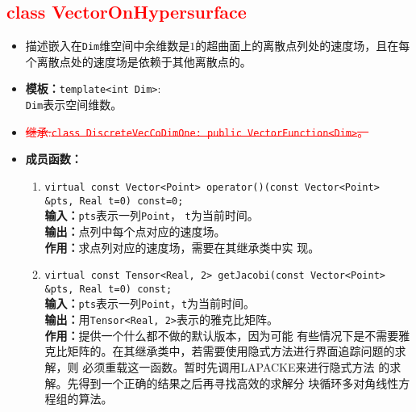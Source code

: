 \documentclass[a4paper,twoside]{ctexart}
\begin{document}
\textcolor{red}{
\section{class VectorOnHypersurface}}
\begin{itemize}
    \item 描述嵌入在\texttt{Dim}维空间中余维数是$1$的超曲面上的离散点列处的速度场，且在每个离散点处的速度场是依赖于其他离散点的。
    \item \textbf{模板：}\texttt{template<int Dim>}:\\
    \texttt{Dim}表示空间维数。
    \item \textcolor{red}{\sout{继承:\texttt{class DiscreteVecCoDimOne: public VectorFunction<Dim>}。}}
    \item \textbf{成员函数：}
            \begin{enumerate}[(1)]
                \item \texttt{virtual const Vector<Point> operator()(const Vector<Point> \&pts, Real t=0) const=0;}\\
                \textbf{输入：}\texttt{pts}表示一列\texttt{Point}，
                \texttt{t}为当前时间。\\
                \textbf{输出：}点列中每个点对应的速度场。\\
                \textbf{作用：}求点列对应的速度场，需要在其继承类中实
                现。
                \item \texttt{virtual const Tensor<Real, 2> getJacobi(const Vector<Point> \&pts, Real t=0) const;}\\
                \textbf{输入：}\texttt{pts}表示一列\texttt{Point}，\texttt{t}为当前时间。\\
                \textbf{输出：}用\texttt{Tensor<Real, 2>}表示的雅克比矩阵。\\
                \textbf{作用：}提供一个什么都不做的默认版本，因为可能
                有些情况下是不需要雅克比矩阵的。在其继承类中，若需要使用隐式方法进行界面追踪问题的求解，则
                  必须重载这一函数。暂时先调用LAPACKE来进行隐式方法
                    的求解。先得到一个正确的结果之后再寻找高效的求解分
                    块循环多对角线性方程组的算法。
            \end{enumerate}
\end{itemize}
\end{document}
